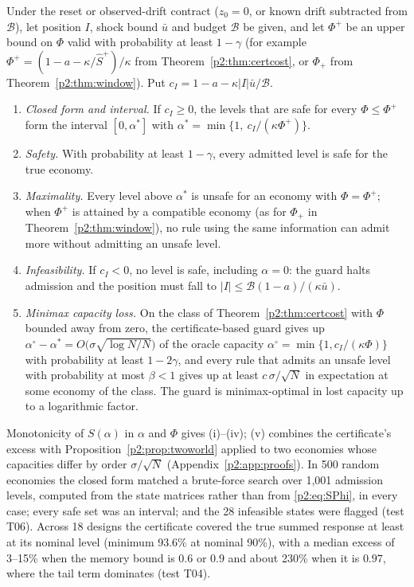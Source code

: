 \begin{theorem}\label{p2:thm:robustguard}
Under the reset or observed-drift contract ($z_0=0$, or known drift subtracted from $\mathcal B$), let position $I$, shock bound $\bar u$ and budget $\mathcal B$ be given, and let $\Phi^+$ be an upper bound on $\Phi$ valid with probability at least $1-\gamma$ (for example $\Phi^+=(1-a-\kappa/\hat S^+)/\kappa$ from Theorem~\ref{p2:thm:certcost}, or $\Phi_+$ from Theorem~\ref{p2:thm:window}). Put $c_I=1-a-\kappa|I|\bar u/\mathcal B$.
\begin{enumerate}[label=(\roman*)]
\item \emph{Closed form and interval.} If $c_I\ge0$, the levels that are safe for every $\Phi\le\Phi^+$ form the interval $[0,\alpha^*]$ with $\alpha^*=\min\{1,\ c_I/(\kappa\Phi^+)\}$.
\item \emph{Safety.} With probability at least $1-\gamma$, every admitted level is safe for the true economy.
\item \emph{Maximality.} Every level above $\alpha^*$ is unsafe for an economy with $\Phi=\Phi^+$; when $\Phi^+$ is attained by a compatible economy (as for $\Phi_+$ in Theorem~\ref{p2:thm:window}), no rule using the same information can admit more without admitting an unsafe level.
\item \emph{Infeasibility.} If $c_I<0$, no level is safe, including $\alpha=0$: the guard halts admission and the position must fall to $|I|\le\mathcal B(1-a)/(\kappa\bar u)$.
\item \emph{Minimax capacity loss.} On the class of Theorem~\ref{p2:thm:certcost} with $\Phi$ bounded away from zero, the certificate-based guard gives up $\alpha^\circ-\alpha^*=O\bigl(\sigma\sqrt{\log N/N}\bigr)$ of the oracle capacity $\alpha^\circ=\min\{1,c_I/(\kappa\Phi)\}$ with probability at least $1-2\gamma$, and every rule that admits an unsafe level with probability at most $\beta<1$ gives up at least $c\,\sigma/\sqrt N$ in expectation at some economy of the class. The guard is minimax-optimal in lost capacity up to a logarithmic factor.
\end{enumerate}
\end{theorem}

Monotonicity of $S(\alpha)$ in $\alpha$ and $\Phi$ gives (i)--(iv); (v) combines the certificate's excess with Proposition~\ref{p2:prop:twoworld} applied to two economies whose capacities differ by order $\sigma/\sqrt N$ (Appendix~\ref{p2:app:proofs}). In 500 random economies the closed form matched a brute-force search over 1{,}001 admission levels, computed from the state matrices rather than from \eqref{p2:eq:SPhi}, in every case; every safe set was an interval; and the 28 infeasible states were flagged (test T06). Across 18 designs the certificate covered the true summed response at least at its nominal level (minimum 93.6\% at nominal 90\%), with a median excess of 3--15\% when the memory bound is $0.6$ or $0.9$ and about 230\% when it is $0.97$, where the tail term dominates (test T04).

